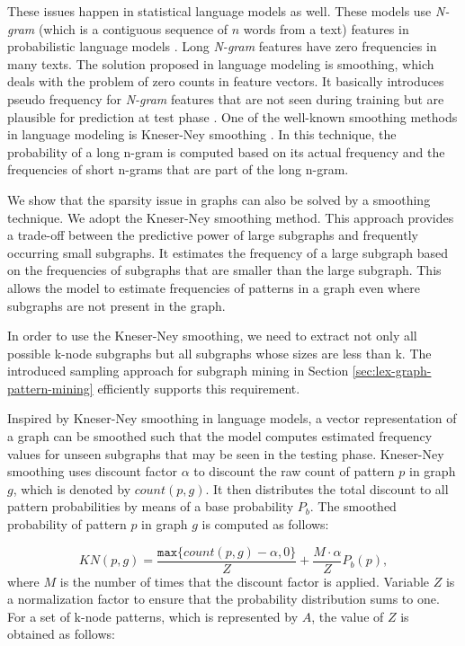 These issues happen in statistical language models as well. 
These models use \emph{N-gram} (which is a contiguous sequence of $n$ words from a text) features in probabilistic language models \cite[p.~98]{jurafsky08}. 
Long \emph{N-gram} features have zero frequencies in many texts.  
The solution proposed in language modeling is smoothing, which deals with the problem of zero counts in feature vectors. 
It basically introduces pseudo frequency for \emph{N-gram} features that are not seen during training but are plausible for prediction at test phase \cite[p.~99]{jurafsky08}. 
One of the \mbox{well-known} smoothing methods in language modeling is \mbox{Kneser-Ney} smoothing \cite[p.~110]{jurafsky08}. 
In this technique, the probability of a long n-gram is computed based on its actual frequency and the frequencies of short n-grams that are part of the long n-gram. 

We show that the sparsity issue in graphs can also be solved by a smoothing technique.  
We adopt the \mbox{Kneser-Ney} smoothing method.   
This approach provides a trade-off between the predictive power of large subgraphs and frequently occurring small subgraphs. 
It estimates the frequency of a large subgraph based on the frequencies of subgraphs that are smaller than the large subgraph. 
This allows the model to estimate frequencies of patterns in a graph even where subgraphs are not present in the graph. 

In order to use the Kneser-Ney smoothing, we need to extract not only all possible k-node subgraphs but all subgraphs whose sizes are less than k. 
The introduced sampling approach for subgraph mining in Section \ref{sec:lex-graph-pattern-mining} efficiently supports this requirement. 

Inspired by \mbox{Kneser-Ney} smoothing in language models, a vector representation of a graph can be smoothed such that the model computes estimated frequency values for unseen subgraphs that may be seen in the testing phase. 
\mbox{Kneser-Ney} smoothing uses discount factor $\alpha$ to discount the raw count of pattern $p$ in  graph $g$, which is denoted by $count(p,g)$. 
It then distributes the total discount to all pattern probabilities by means of a base probability $P_b$.
The smoothed probability of pattern $p$ in graph $g$ is computed as follows:

\begin{equation}
  \label{eq:knser-ney}
  KN(p,g) = \frac{\mathtt{max} \lbrace  count(p,g)-\alpha, 0 \rbrace }{Z} + \frac{M \cdot \alpha}{Z}P_b(p),
\end{equation}
where $M$ is the number of times that the discount factor is applied. 
Variable $Z$ is a normalization factor to ensure that the probability distribution sums to one.  
For a set of k-node patterns, which is represented by $A$, the value of $Z$ is obtained as follows:

